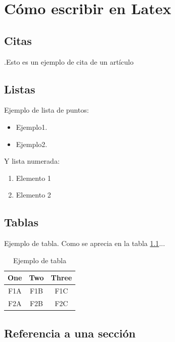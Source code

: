 \chapter{Cómo escribir en Latex}

\section{Citas}



.Esto es un ejemplo de cita de un artículo \cite{chen}


\section{Listas}

Ejemplo de lista de puntos:
\begin{itemize}
\item Ejemplo1.
\item Ejemplo2.
\end{itemize} 

Y lista numerada:
\begin{enumerate}
\item Elemento 1
\item Elemento 2
\end{enumerate}

\section{Tablas}

Ejemplo de tabla. Como se aprecia en la tabla \ref{tab:table_example}...
\begin{table}[tb]
\caption{Ejemplo de tabla}
\label{tab:table_example}
\begin{center}
\begin{tabular}{|c||c|c|}
\hline
One & Two & Three\\
\hline
F1A & F1B & F1C\\
F2A & F2B & F2C\\
\hline
\end{tabular}
\end{center}
\end{table}

\section{Referencia a una sección}
\label{sec:refsec}

